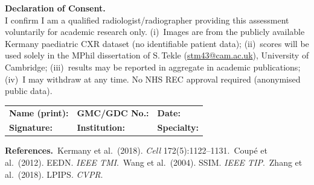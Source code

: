 \documentclass[a4paper,10pt]{article}
\begin{document}
\vspace{0.28cm}

\begin{mdframed}[linewidth=0.8pt, innertopmargin=7pt, innerbottommargin=7pt, innerleftmargin=8pt, innerrightmargin=8pt]
{\small
\noindent\textbf{Declaration of Consent.} \\
I confirm I am a qualified radiologist/radiographer providing this assessment voluntarily for academic research only. 
(i)~Images are from the publicly available Kermany paediatric CXR dataset (no identifiable patient data); 
(ii)~scores will be used solely in the MPhil dissertation of S.\,Tekle (\href{mailto:stm43@cam.ac.uk}{stm43@cam.ac.uk}), University of Cambridge; 
(iii)~results may be reported in aggregate in academic publications; 
(iv)~I may withdraw at any time. No NHS REC approval required (anonymised public data).

\vspace{12pt}

\noindent
\begin{tabularx}{\textwidth}{@{} X X X @{}}
\textbf{Name (print):}\dotfill & \textbf{GMC/GDC No.:}\dotfill & \textbf{Date:}\dotfill \\[18pt]
\textbf{Signature:}\dotfill & \textbf{Institution:}\dotfill & \textbf{Specialty:}\dotfill \\
\end{tabularx}
}
\end{mdframed}

{\footnotesize\textbf{References.}\quad
[1]~Kermany et al.\ (2018). \textit{Cell} 172(5):1122--1131.\quad
[2]~Coup\'e et al.\ (2012). EEDN. \textit{IEEE TMI}.\quad
[3]~Wang et al.\ (2004). SSIM. \textit{IEEE TIP}.\quad
[4]~Zhang et al.\ (2018). LPIPS. \textit{CVPR}.}
\end{document}
